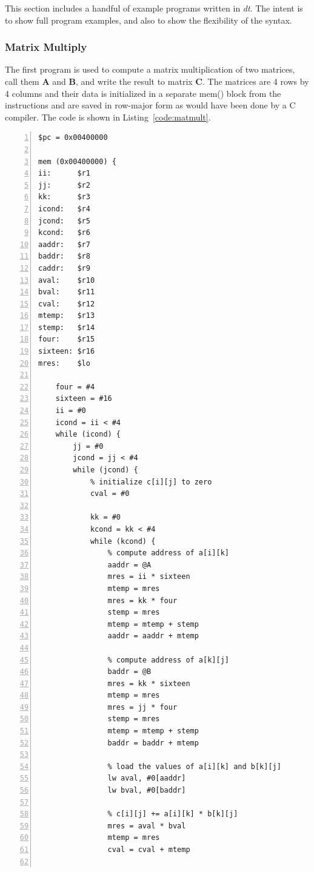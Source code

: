 This section includes a handful of example programs written in \emph{dt}.
The intent is to show full program examples, and also to show 
the flexibility of the syntax.

\subsubsection{Matrix Multiply}
The first program is used to compute a matrix multiplication of 
two matrices, call them \textbf{A} and \textbf{B}, and write the 
result to matrix \textbf{C}.  The matrices are
4 rows by 4 columns and their data is initialized in a 
separate mem() block from the instructions and are saved 
in row-major form as would have been done by a C compiler.  The code is 
shown in Listing~\ref{code:matmult}.


\begin{lstlisting}[label=code:matmult,caption=Matrix multiplication example source code,basicstyle=\footnotesize,numbers=left,numberstyle=\tiny,stepnumber=1, numbersep=6pt,frame=single,captionpos=b,escapechar=`]
$pc = 0x00400000

mem (0x00400000) {
ii:      $r1
jj:      $r2
kk:      $r3
icond:   $r4
jcond:   $r5
kcond:   $r6
aaddr:   $r7
baddr:   $r8
caddr:   $r9
aval:    $r10
bval:    $r11
cval:    $r12
mtemp:   $r13
stemp:   $r14
four:    $r15
sixteen: $r16
mres:    $lo

    four = #4
    sixteen = #16
    ii = #0
    icond = ii < #4
    while (icond) {
        jj = #0
        jcond = jj < #4
        while (jcond) {
            % initialize c[i][j] to zero
            cval = #0

            kk = #0
            kcond = kk < #4
            while (kcond) {
                % compute address of a[i][k]
                aaddr = @A
                mres = ii * sixteen
                mtemp = mres
                mres = kk * four
                stemp = mres
                mtemp = mtemp + stemp
                aaddr = aaddr + mtemp

                % compute address of a[k][j]
                baddr = @B
                mres = kk * sixteen
                mtemp = mres
                mres = jj * four
                stemp = mres
                mtemp = mtemp + stemp
                baddr = baddr + mtemp

                % load the values of a[i][k] and b[k][j]
                lw aval, #0[aaddr]
                lw bval, #0[baddr]

                % c[i][j] += a[i][k] * b[k][j]
                mres = aval * bval
                mtemp = mres
                cval = cval + mtemp


\end{lstlisting}
